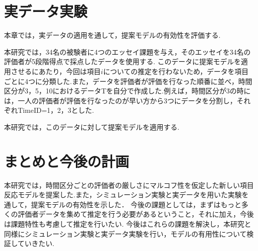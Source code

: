 \documentclass[twocolumn, a4paper]{hcresume}
\begin{document}
\section{実データ実験}
本章では，実データの適用を通して，提案モデルの有効性を評価する.

本研究では，34名の被験者に4つのエッセイ課題を与え，そのエッセイを34名の評価者が5段階得点で採点したデータを使用する.
このデータに提案モデルを適用させるにあたり，今回は項目$i$についての推定を行わないため，データを項目ごとに4つに分類した.また，データを評価者が評価を行なった順番に並べ，時間区分が3，5，10におけるデータTを自分で作成した.例えば，時間区分が3の時には，一人の評価者が評価を行なったのが早い方から3つにデータを分割し，それぞれTimeID=1，2，3とした.

本研究では，このデータに対して提案モデルを適用する.

\section{まとめと今後の計画}
本研究では，時間区分ごとの評価者の厳しさにマルコフ性を仮定した新しい項目反応モデルを提案した.また，シミュレーション実験と実データを用いた実験を通して，提案モデルの有効性を示した．
今後の課題としては，まずはもっと多くの評価者データを集めて推定を行う必要があるということ，それに加え，今後は課題特性も考慮して推定を行いたい.
今後はこれらの課題を解決し，本研究と同様にシミュレーション実験と実データ実験を行い，モデルの有用性について検証していきたい.

{\small
\begin{thebibliography}{*}

\end{thebibliography}
}
\end{document}
